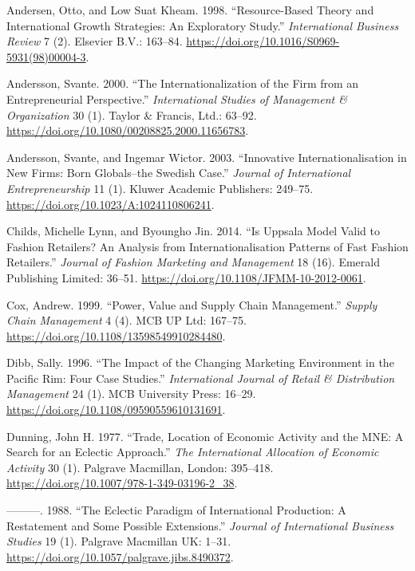 \documentclass[hyperref, a4paper]{ctexart}
\begin{document}
\leavevmode\hypertarget{ref-innovative5}{}%
Andersen, Otto, and Low Suat Kheam. 1998. ``Resource-Based Theory and
International Growth Strategies: An Exploratory Study.''
\emph{International Business Review} 7 (2). Elsevier B.V.: 163--84.
\url{https://doi.org/10.1016/S0969-5931(98)00004-3}.

\leavevmode\hypertarget{ref-innovative1}{}%
Andersson, Svante. 2000. ``The Internationalization of the Firm from an
Entrepreneurial Perspective.'' \emph{International Studies of Management
\& Organization} 30 (1). Taylor \& Francis, Ltd.: 63--92.
\url{https://doi.org/10.1080/00208825.2000.11656783}.

\leavevmode\hypertarget{ref-innovativeInternationalisation}{}%
Andersson, Svante, and Ingemar Wictor. 2003. ``Innovative
Internationalisation in New Firms: Born Globals--the Swedish Case.''
\emph{Journal of International Entrepreneurship} 11 (1). Kluwer Academic
Publishers: 249--75. \url{https://doi.org/10.1023/A:1024110806241}.

\leavevmode\hypertarget{ref-innovative7}{}%
Childs, Michelle Lynn, and Byoungho Jin. 2014. ``Is Uppsala Model Valid
to Fashion Retailers? An Analysis from Internationalisation Patterns of
Fast Fashion Retailers.'' \emph{Journal of Fashion Marketing and
Management} 18 (16). Emerald Publishing Limited: 36--51.
\url{https://doi.org/10.1108/JFMM-10-2012-0061}.

\leavevmode\hypertarget{ref-innovative2}{}%
Cox, Andrew. 1999. ``Power, Value and Supply Chain Management.''
\emph{Supply Chain Management} 4 (4). MCB UP Ltd: 167--75.
\url{https://doi.org/10.1108/13598549910284480}.

\leavevmode\hypertarget{ref-innovative8}{}%
Dibb, Sally. 1996. ``The Impact of the Changing Marketing Environment in
the Pacific Rim: Four Case Studies.'' \emph{International Journal of
Retail \& Distribution Management} 24 (1). MCB University Press: 16--29.
\url{https://doi.org/10.1108/09590559610131691}.

\leavevmode\hypertarget{ref-innovative9}{}%
Dunning, John H. 1977. ``Trade, Location of Economic Activity and the
MNE: A Search for an Eclectic Approach.'' \emph{The International
Allocation of Economic Activity} 30 (1). Palgrave Macmillan, London:
395--418. \url{https://doi.org/10.1007/978-1-349-03196-2_38}.

\leavevmode\hypertarget{ref-innovative10}{}%
---------. 1988. ``The Eclectic Paradigm of International Production: A
Restatement and Some Possible Extensions.'' \emph{Journal of
International Business Studies} 19 (1). Palgrave Macmillan UK: 1--31.
\url{https://doi.org/10.1057/palgrave.jibs.8490372}.
\end{document}
